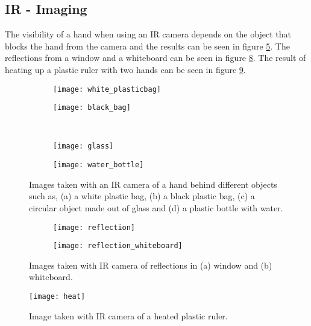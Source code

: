 \subsection{IR - Imaging}
The visibility of a hand when using an IR camera depends on the object that blocks the hand from the camera and the results can be seen in figure \ref{fig:hand}. The reflections from a window and a whiteboard can be seen in figure \ref{fig:ref}. The result of heating up a plastic ruler with two hands can be seen in figure \ref{fig:heat}.
\begin{figure}
	\centering
	\begin{subfigure}[b]{0.4\textwidth}
		\texttt{[image: white\_plasticbag]}
		\caption{}
		\label{fig:whiteBag}
	\end{subfigure}
	\begin{subfigure}[b]{0.4\textwidth}
		\texttt{[image: black\_bag]}
		\caption{}
		\label{fig:blackBag}
	\end{subfigure}
	\\
	\begin{subfigure}[b]{0.4\textwidth}
		\texttt{[image: glass]}
		\caption{}
		\label{fig:glass}
	\end{subfigure}
	\begin{subfigure}[b]{0.4\textwidth}
		\texttt{[image: water\_bottle]}
		\caption{}
		\label{fig:waterBottle}
	\end{subfigure}
	\caption{Images taken with an IR camera of a hand behind different objects such as, (a) a white plastic bag, (b) a black plastic bag, (c) a circular object made out of glass and (d) a plastic bottle with water.}
	\label{fig:hand}
\end{figure}
\begin{figure}
	\centering
	\begin{subfigure}[b]{0.4\textwidth}
		\texttt{[image: reflection]}
		\caption{}
		\label{fig:refWin}
	\end{subfigure}
	\begin{subfigure}[b]{0.4\textwidth}
		\texttt{[image: reflection\_whiteboard]}
		\caption{}
		\label{fig:refWB}
	\end{subfigure}
	\caption{Images taken with IR camera of reflections in (a) window and (b) whiteboard.}
	\label{fig:ref}
\end{figure}
\begin{figure}
	\centering
	\texttt{[image: heat]}
	\caption{Image taken with IR camera of a heated plastic ruler.}
	\label{fig:heat}
\end{figure}